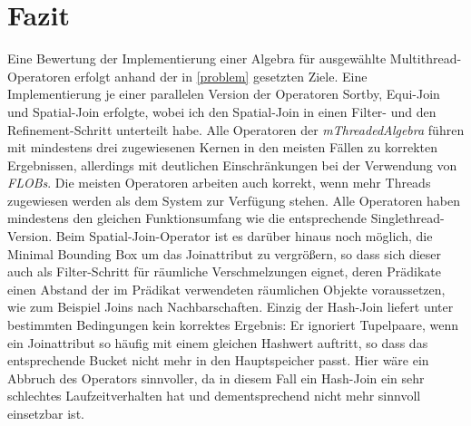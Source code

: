 \documentclass[a4paper,12pt,twoside]{article}
\newcommand{\Fb}[1]{\textit{#1}} %
\begin{document}
\section{Fazit}

Eine Bewertung der Implementierung einer Algebra für ausgewählte Multithread-Operatoren erfolgt anhand der in \autoref{problem} gesetzten Ziele. Eine Implementierung je einer parallelen Version der Operatoren Sortby, Equi-Join und Spatial-Join erfolgte, wobei ich den Spatial-Join in einen Filter- und den Refinement-Schritt unterteilt habe. Alle Operatoren der \Fb{mThreadedAlgebra} führen mit mindestens drei zugewiesenen Kernen in den meisten Fällen zu korrekten Ergebnissen, allerdings mit deutlichen Einschränkungen bei der Verwendung von \Fb{FLOBs}. Die meisten Operatoren arbeiten auch korrekt, wenn mehr Threads zugewiesen werden als dem System zur Verfügung stehen. Alle Operatoren haben mindestens den gleichen Funktionsumfang wie die entsprechende Singlethread-Version. Beim Spatial-Join-Operator ist es darüber hinaus noch möglich, die Minimal Bounding Box um das Joinattribut zu vergrößern, so dass sich dieser auch als Filter-Schritt für räumliche Verschmelzungen eignet, deren Prädikate einen Abstand der im Prädikat verwendeten räumlichen Objekte voraussetzen, wie zum Beispiel Joins nach Nachbarschaften. Einzig der Hash-Join liefert unter bestimmten Bedingungen kein korrektes Ergebnis: Er ignoriert Tupelpaare, wenn ein Joinattribut so häufig mit einem gleichen Hashwert auftritt, so dass das entsprechende Bucket nicht mehr in den Hauptspeicher passt. Hier wäre ein Abbruch des Operators sinnvoller, da in diesem Fall ein Hash-Join ein sehr schlechtes Laufzeitverhalten hat und dementsprechend nicht mehr sinnvoll einsetzbar ist.
\end{document}
